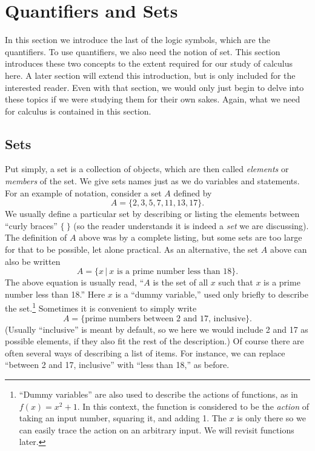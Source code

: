 \section{Quantifiers and Sets\label{QuantifiersAndSets}}

In this section we introduce the last of the logic symbols, which
are the quantifiers.  To use quantifiers, we also need the notion
of set.  This section introduces these two concepts to the extent
required for our study of calculus here.  A later section will extend
this introduction, but is only included for the interested reader.
Even with that section, we would only just begin to delve into
these topics if we were studying them for their own sakes.
Again, what we need for calculus is contained in this section.

\subsection{Sets}
Put simply, a set is a collection of objects, which are then
called {\it elements} or {\it members} of the set.  We give sets names
just as we do variables and statements.  
For an example of notation, consider a set $A$ defined by
$$A=\{2,3,5,7,11,13,17\}.$$
We usually define a particular set by
describing or listing the elements between ``curly braces''
$\{\ \}$ (so the reader understands it is indeed a {\it set}
we are discussing).  The definition of 
$A$ above was by a complete listing, but
some sets are too large for that to be possible, let alone practical.
As an alternative, the set $A$ above can also be written
$$A=\{x\,|\ x\text{ is a prime number less than 18}\}.$$
The above equation is usually read, ``$A$ is the set of all $x$
such that $x$ is a prime number less than 18.''  Here $x$ is
a ``dummy variable,'' used only briefly to describe the set.\footnote{%
``Dummy variables'' are also used to describe the actions of  functions,
as in $f(x)=x^2+1$.  In this context, the function is considered to
be the {\it action} of taking an input number, squaring it, and adding
1.  The $x$ is only there so we can easily trace the action
on an arbitrary input.  We will revisit functions later.
}
Sometimes it is convenient to simply write
$$A=\{\text{prime numbers between 2 and 17, inclusive}\}.$$
(Usually ``inclusive'' is meant by default, so we here we would include
2 and 17 as possible elements, if they also fit the rest of the description.)
Of course there
are often several ways of describing a list of items.  For instance,
we can replace ``between 2 and 17, inclusive'' with ``less than 18,''
as before. 

